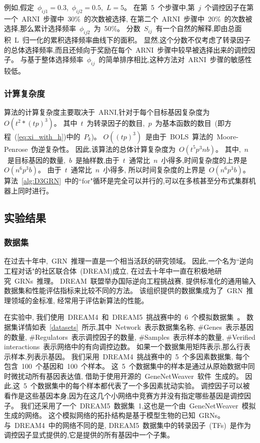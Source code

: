 例如,假定~$\phi_{ij1}=0.3$,~$\phi_{ij2}=0.5$,~$L=5$。
在第~5~个步骤中,第~$j$~个调控因子在第一个~ARNI~步骤中~30\%~的次数被选择,
在第二个~ARNI~步骤中~20\%~的次数被选择,那么累计选择频率~$\phi_{ij2}$~为~50\%。
分数~$S_{ij}$~有一个自然的解释,即由总面积~L~归一化的累积选择频率曲线下的面积。
显然,这个分数不仅考虑了转录因子的总体选择频率,而且还倾向于奖励在每个~ARNI~步骤中较早被选择出来的调控因子。
与基于整体选择频率~$\phi_{ij}$~的简单排序相比,这种方法对~ARNI~步骤的敏感性较低。

\subsubsection{计算复杂度}

算法的计算复杂度主要取决于~ARNI,针对于每个目标基因复杂度为~$O(t^2*(tp)^3)$。
其中~$t$~为转录因子的数目,~$p$~为基本函数的数目~(即方程~(\ref{eq:xi_with_h})中的~$P_k$)。
$O((tp)^3)$~是由于~BOLS~算法的~Moore-Penrose~伪逆复杂性。
因此,该算法的总体计算复杂度为~$O(t^5p^3nb)$。
其中,~$n$~是目标基因的数量,~$b$~是抽样数,由于~$t$~通常比~$n$~小得多,时间复杂度的上界是~$O(n^6p^3b)$。
由于~$t$~通常比~$n$~小得多, 所以时间复杂度的上界是~$O(n^6p^3b)$。
算法~\ref{alg:D3GRN}~中的``for"循环是完全可以并行的,可以在多核甚至分布式集群机器上同时进行。


\subsection{实验结果}

\subsubsection{数据集}

在过去十年中,~GRN~推理一直是一个相当活跃的研究领域。
因此,一个名为``逆向工程对话"的社区联合体~(DREAM)\cite{stolovitzky2007dialogue}成立,
在过去十年中一直在积极地研究~GRNs~推理。
DREAM~联盟举办国际逆向工程挑战赛, 提供标准化的通用输入数据集和性能评估指标来比较不同的方法。
该组织提供的数据集成为了~GRN~推理领域的金标准, 经常用于评估新算法的性能。

在实验中,
我们使用~DREAM4~和~DREAM5~挑战赛中的~6~个模拟数据集~\cite{marbach2012wisdom}。
数据集详情如表~\ref{datasets}~所示,其中~Network~表示数据集名称,
\#Genes~表示基因的数量, \#Regulators~表示调控因子的数量, \#Samples~表示样本的数量, 
\#Verified interactions~表示网络中的有向调控边数。
如果一个数据集用矩阵表示,那么行表示样本,列表示基因。
我们采用~DREAM4~挑战赛中的~5~个多因素数据集,
每个包含~100~个基因和~100~个样本。
这~5~个数据集中的样本是通过从原始数据中同时微扰动所有基因表达值, 借助于使用开源的~GeneNetWeaver~软件~\cite{marbach2009generating}生成的。
因此,这~5~个数据集中的每个样本都代表了一个多因素扰动实验。
调控因子可以被看作是这些基因本身,因为在这几个小网络中竞赛方并没有指定哪些基因是调控因子。
我们还采用了一个~DREAM5~数据集~1,这也是一个由~GeneNetWeaver~模拟生成的网络。
这个模拟网络的拓扑结构是基于模型生物的已知~GRNs。
与~DREAM4~中的网络不同的是,
DREAM5~数据集中的转录因子~(TFs)~是作为调控因子显式提供的,它是提供的所有基因中一个子集。

